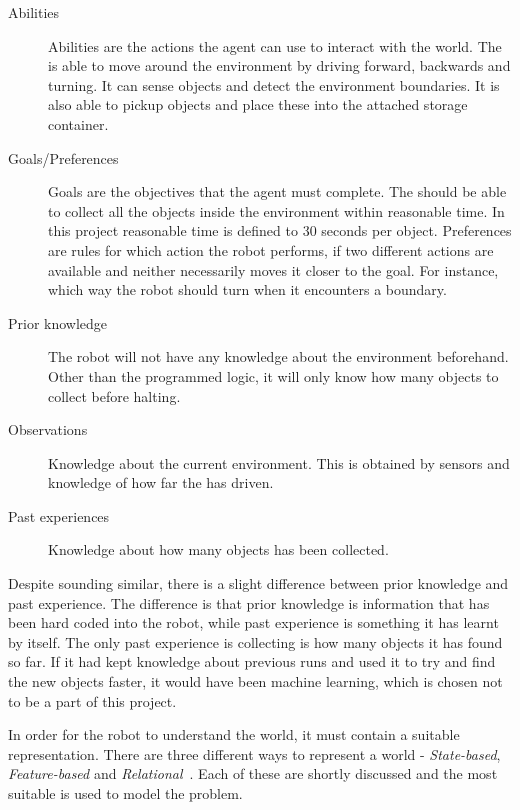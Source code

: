 \begin{description}
\item[Abilities] Abilities are the actions the agent can use to interact with the world. The \projname{} is able to move around the environment by driving forward, backwards and turning. It can sense objects and detect the environment boundaries. It is also able to pickup objects and place these into the attached storage container.  
\item[Goals/Preferences] Goals are the objectives that the agent must complete. The \projname{} should be able to collect all the objects inside the environment within reasonable time. In this project reasonable time is defined to 30 seconds per object. Preferences are rules for which action the robot performs, if two different actions are available and neither necessarily moves it closer to the goal. For instance, which way the robot should turn when it encounters a boundary.
\item[Prior knowledge] The robot will not have any knowledge about the environment beforehand. Other than the programmed logic, it will only know how many objects to collect before halting.
\item[Observations] Knowledge about the current environment. This is obtained by sensors and knowledge of how far the \projname{} has driven. 
\item[Past experiences] Knowledge about how many objects has been collected. 
\end{description}

Despite sounding similar, there is a slight difference between prior knowledge and past experience. The difference is that prior knowledge is information that has been hard coded into the robot, while past experience is something it has learnt by itself. The only past experience \projname{} is collecting is how many objects it has found so far. If it had kept knowledge about previous runs and used it to try and find the new objects faster, it would have been machine learning, which is chosen not to be a part of this project.

In order for the robot to understand the world, it must contain a suitable representation. There are three different ways to represent a world - \emph{State-based}, \emph{Feature-based} and \emph{Relational}~\citep{artificialintelligencebook}. Each of these are shortly discussed and the most suitable is used to model the problem. 


